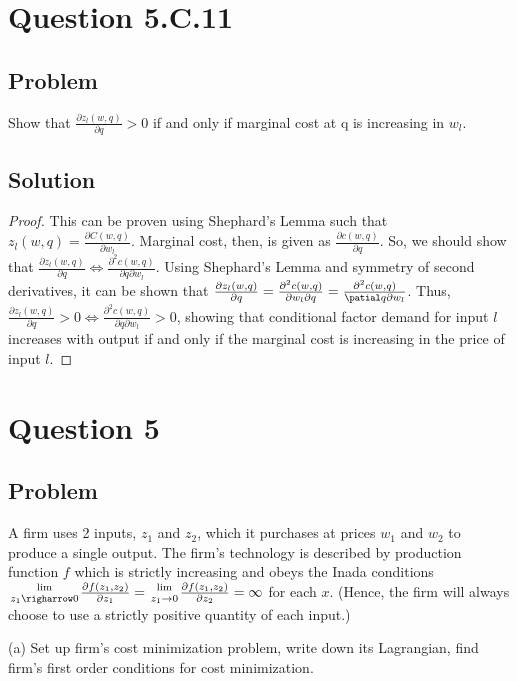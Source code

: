 \documentclass[10pt, a4paper]{article}
\begin{document}
  \section{Question 5.C.11}
    \subsection*{Problem}
      Show that $\frac{\partial z_l(w,q)}{\partial q}>0$ if and only if marginal cost at q is increasing in $w_l$.
    \subsection*{Solution}
      \begin{proof}
        This can be proven using Shephard's Lemma such that $z_l(w,q) = \frac{\partial C(w,q)}{\partial w_l}$. Marginal cost, then, is given as $\frac{\partial c(w,q)}{\partial q}$. So, we should show that $\frac{\partial z_l (w,q)}{\partial q}\Leftrightarrow \frac{\partial^2c(w,q)}{\partial q\partial w_l}$. Using Shephard's Lemma and symmetry of second derivatives, it can be shown that $\frac{\partial z_l(w,q)}{\partial q} = \frac{\partial^2 c(w,q)}{\partial w_l\partial q}=\frac{\partial^2 c(w,q)}{\patial q\partial w_l}$. Thus, $\frac{\partial z_l(w,q)}{\partial q}>0\Leftrightarrow \frac{\partial^2c(w,q)}{\partial q\partial w_l}>0$, showing that conditional factor demand for input $l$ increases with output if and only if the marginal cost is increasing in the price of input $l$.
      \end{proof}
  \section{Question 5}
    \subsection*{Problem}
      A firm uses 2 inputs, $z_1$ and $z_2$, which it purchases at prices $w_1$ and $w_2$ to produce a single output. The firm's technology is described by production function $f$ which is strictly increasing and obeys the Inada conditions ${\lim\atop{z_1\righarrow0}}\frac{\partial f(z_1,z_2)}{\partial z_1}={\lim\atop{z_1\rightarrow0}}\frac{\partial f(z_1, z_2)}{\partial z_2}=\infty$ for each $x$. (Hence, the firm will always choose to use a strictly positive quantity of each input.)

      (a) Set up firm's cost minimization problem, write down its Lagrangian, find firm's first order conditions for cost minimization.
\end{document}
